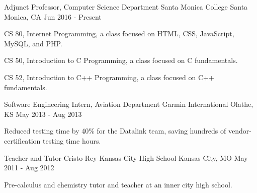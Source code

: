 


\begin{cventries}


\cventry
{Adjunct Professor, Computer Science Department}
{Santa Monica College}
{Santa Monica, CA}
{Jun 2016 - Present}
{
\begin{cvitems}
\item CS 80, Internet Programming, a class focused on HTML, CSS, JavaScript, MySQL, and PHP.
\item CS 50, Introduction to C Programming, a class focused on C fundamentals.
\item CS 52, Introduction to C++ Programming, a class focused on C++ fundamentals.
\end{cvitems}
}


\cventry
{Software Engineering Intern, Aviation Department}
{Garmin International}
{Olathe, KS}
{May 2013 - Aug 2013}
{
\begin{cvitems}
\item Reduced testing time by 40\% for the Datalink team, saving hundreds of vendor-certification testing time hours.
\end{cvitems}
}


\cventry
{Teacher and Tutor}
{Cristo Rey Kansas City High School}
{Kansas City, MO}
{May 2011 - Aug 2012}
{
\begin{cvitems}
\item Pre-calculus and chemistry tutor and teacher at an inner city high school.
\end{cvitems}
}

\end{cventries}